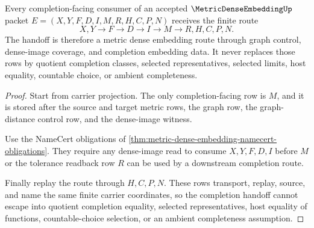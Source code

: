 \begin{theorem}
\label{thm:metric-dense-embedding-completion-handoff}
Every completion-facing consumer of an accepted $\MetricDenseEmbeddingUp$ packet $E=(X,Y,F,D,I,M,R,H,C,P,N)$ receives the finite route
$$
X,Y \longrightarrow F \longrightarrow D \longrightarrow I \longrightarrow M \longrightarrow R,H,C,P,N .
$$
The handoff is therefore a metric dense embedding route through graph control, dense-image coverage, and completion embedding data. It never replaces those rows by quotient completion classes, selected representatives, selected limits, host equality, countable choice, or ambient completeness.
\end{theorem}
\begin{proof}
Start from carrier projection. The only completion-facing row is $M$, and it is stored after the source and target metric rows, the graph row, the graph-distance control row, and the dense-image witness.

Use the NameCert obligations of \autoref{thm:metric-dense-embedding-namecert-obligations}. They require any dense-image read to consume $X,Y,F,D,I$ before $M$ or the tolerance readback row $R$ can be used by a downstream completion route.

Finally replay the route through $H,C,P,N$. These rows transport, replay, source, and name the same finite carrier coordinates, so the completion handoff cannot escape into quotient completion equality, selected representatives, host equality of functions, countable-choice selection, or an ambient completeness assumption.
\end{proof}


\begin{closurestatus}{\MetricDenseEmbeddingUp}
  \theoryclosure{\seedClosure}
  \formalstatus{\unformalizedV}
\end{closurestatus}
